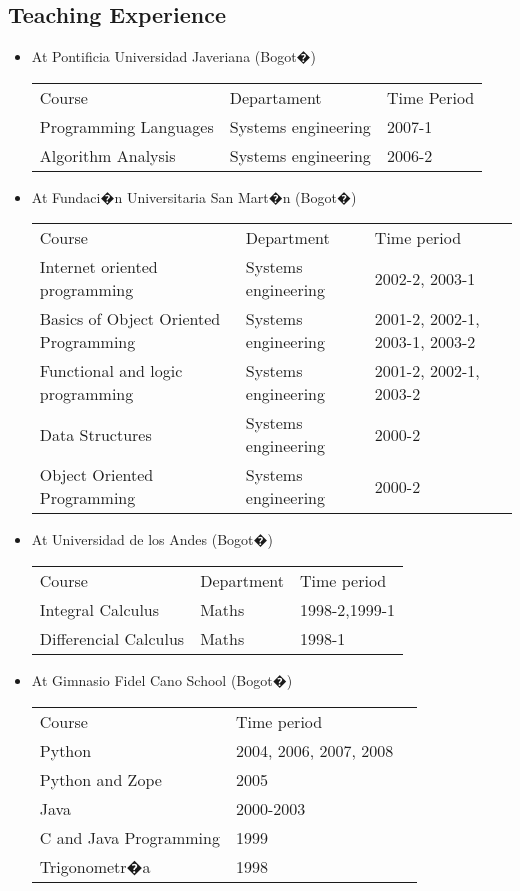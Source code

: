 \documentclass{article}
\begin{document}
\subsection{Teaching Experience}
\begin{itemize}
\item At Pontificia Universidad Javeriana (Bogot�)\\
  \begin{longtable}{p{5cm}p{4cm}p{6cm}}
Course & Departament & Time Period \\
Programming Languages & Systems engineering & 2007-1 \\
Algorithm Analysis & Systems engineering & 2006-2 \\
\end{longtable}
\item At Fundaci�n Universitaria San Mart�n (Bogot�) \\
  \begin{longtable}{p{5cm}p{4cm}p{6cm}}
Course & Department & Time period \\
Internet oriented programming & Systems engineering & 2002-2, 2003-1 \\
Basics of Object Oriented Programming & Systems engineering & 2001-2, 2002-1, 2003-1,
2003-2 \\
Functional and logic programming & Systems engineering & 2001-2, 2002-1, 2003-2 \\
Data Structures & Systems engineering & 2000-2 \\
Object Oriented Programming & Systems engineering & 2000-2 \\
  \end{longtable}
\item At Universidad de los Andes (Bogot�)\\
  \begin{longtable}{p{5cm}p{4cm}p{6cm}}
Course & Department & Time period \\
Integral Calculus & Maths & 1998-2,1999-1 \\
Differencial Calculus & Maths & 1998-1 \\
  \end{longtable}
\item At Gimnasio Fidel Cano School (Bogot�) \\
  \begin{longtable}{p{5cm}p{4cm}p{3cm}}
Course & Time period \\
Python  & 2004, 2006, 2007, 2008 \\
Python and Zope  & 2005 \\
Java & 2000-2003 \\
C and Java Programming & 1999 \\
Trigonometr�a &  1998 \\
  \end{longtable}
\end{itemize}
\end{document}
